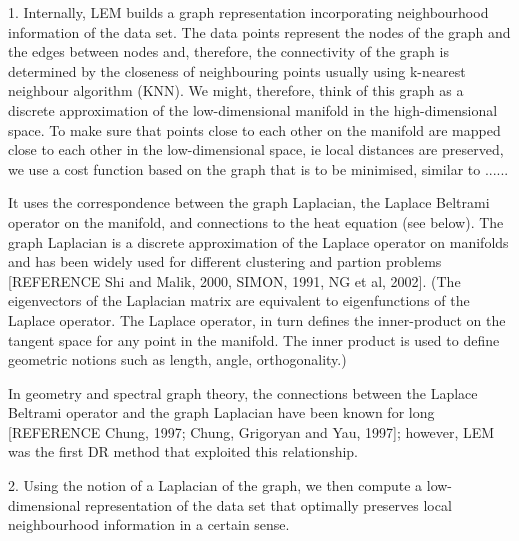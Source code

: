 \documentclass[journal, a4paper]{IEEEtran}
\begin{document}






1. Internally, LEM builds a graph representation incorporating neighbourhood information of the data set. The data points represent the nodes of the graph and the edges between nodes and, therefore, the connectivity of the graph is determined by the closeness of neighbouring points usually using k-nearest neighbour algorithm (KNN). We might, therefore, think of this graph as a discrete approximation of the low-dimensional manifold in the high-dimensional space. 
To make sure that points close to each other on the manifold are mapped close to each other in the low-dimensional space, ie local distances are preserved, we use a cost function based on the graph that is to be minimised, similar to ......

It uses the correspondence between the graph Laplacian, the Laplace Beltrami operator on the manifold, and connections to the heat equation (see below). The graph Laplacian is a discrete approximation of the Laplace operator on manifolds and has been widely used for different clustering and partion problems [REFERENCE Shi and Malik, 2000, SIMON, 1991, NG et al, 2002]. (The eigenvectors of the Laplacian matrix are equivalent to eigenfunctions of the Laplace operator. The Laplace operator, in turn defines the inner-product on the tangent space for any point in the manifold. The inner product is used to define geometric notions such as length, angle, orthogonality.)

In geometry and spectral graph theory, the connections between the Laplace Beltrami operator and the graph Laplacian have been known for long [REFERENCE Chung, 1997; Chung, Grigoryan and Yau, 1997]; however, LEM was the first DR method that exploited this relationship. 

2. Using the notion of a Laplacian of the graph, we then compute a low-dimensional representation of the data set that optimally preserves local neighbourhood information in a certain sense.
\end{document}
